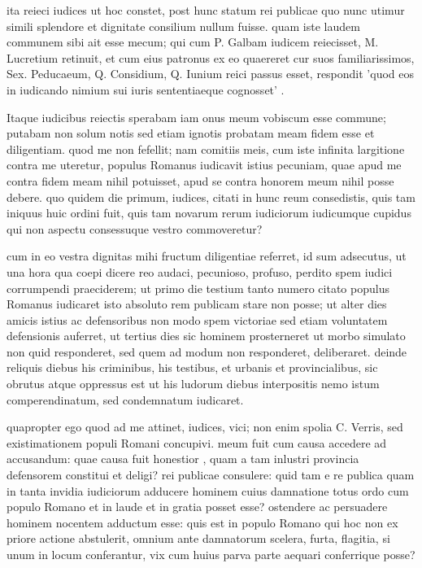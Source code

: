 ita reieci iudices ut hoc constet, post hunc statum rei publicae quo nunc utimur simili splendore et dignitate consilium nullum fuisse. quam iste laudem communem sibi ait esse mecum; qui cum P. Galbam iudicem reiecisset, M. Lucretium retinuit, et cum eius patronus ex eo quaereret cur suos familiarissimos, Sex. Peducaeum, Q. Considium, Q. Iunium reici passus esset, respondit 'quod eos in iudicando nimium sui iuris sententiaeque cognosset' .

 Itaque iudicibus reiectis sperabam iam onus meum vobiscum esse commune; putabam non solum notis sed etiam ignotis probatam meam fidem esse et diligentiam. quod me non fefellit; nam comitiis meis, cum iste infinita largitione contra me uteretur, populus Romanus iudicavit istius pecuniam, quae apud me contra fidem meam nihil potuisset, apud se contra honorem meum nihil posse debere. quo quidem die primum, iudices, citati in hunc reum consedistis, quis tam iniquus huic ordini fuit, quis tam novarum rerum iudiciorum iudicumque cupidus qui non aspectu consessuque vestro commoveretur?

 cum in eo vestra dignitas mihi fructum diligentiae referret, id sum adsecutus, ut una hora qua coepi dicere reo audaci, pecunioso, profuso, perdito spem iudici corrumpendi praeciderem; ut primo die testium tanto numero citato populus Romanus iudicaret isto absoluto rem publicam stare non posse; ut alter dies amicis istius ac defensoribus non modo spem victoriae sed etiam voluntatem defensionis auferret, ut tertius dies sic hominem prosterneret ut morbo simulato non quid responderet, sed quem ad modum non responderet, deliberaret. deinde reliquis diebus his criminibus, his testibus, et urbanis et provincialibus, sic obrutus atque oppressus est ut his ludorum diebus interpositis nemo istum comperendinatum, sed condemnatum iudicaret.

 quapropter ego quod ad me attinet, iudices, vici; non enim spolia C. Verris, sed existimationem populi Romani concupivi. meum fuit cum causa accedere ad accusandum: quae causa fuit honestior , quam a tam inlustri provincia defensorem constitui et deligi? rei publicae consulere: quid tam e re publica quam in tanta invidia iudiciorum adducere hominem cuius damnatione totus ordo cum populo Romano et in laude et in gratia posset esse? ostendere ac persuadere hominem nocentem adductum esse: quis est in populo Romano qui hoc non ex priore actione abstulerit, omnium ante damnatorum scelera, furta, flagitia, si unum in locum conferantur, vix cum huius parva parte aequari conferrique posse?

